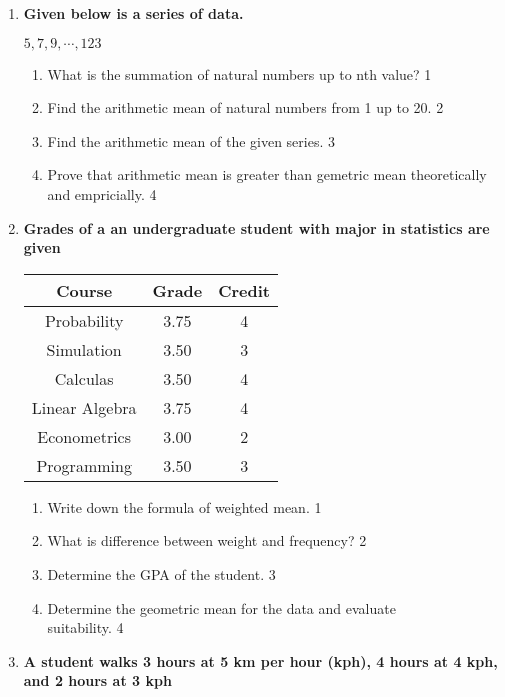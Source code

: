 \documentclass[a4paper,oneside]{book}
\begin{document}
\begin{enumerate}
   \item
	  \textbf{Given below is a series of data.} 
	  
	  	    \begin{center}
	 $5, 7, 9, \cdots , 123$
	    \end{center}
  
  \begin{enumerate}
    \item
	What is the summation of natural numbers up to nth value? \hfill 1
    \item
	Find the arithmetic mean of natural numbers from 1 up to 20. \hfill 2
    \item  
	Find the arithmetic mean of the given series. \hfill 3
    \item
	Prove that arithmetic mean is greater than gemetric mean theoretically and empricially. \hfill 4
  \end{enumerate}
  
   \item
	  \textbf{Grades of a an undergraduate student with major in statistics are given} 

\begin{table}[h]
\centering
\begin{tabular}{c|c|c}
\hline
Course & Grade & Credit \\ \hline
Probability & 3.75 & 4 \\ 
Simulation & 3.50 & 3 \\ 
Calculas & 3.50 & 4 \\ 
Linear Algebra & 3.75 & 4 \\ 
Econometrics & 3.00 & 2 \\ 
Programming & 3.50 & 3 \\ \hline
\end{tabular}
\end{table}

  
  \begin{enumerate}
    \item
	Write down the formula of weighted mean. \hfill 1
    \item
	What is difference between weight and frequency? \hfill 2
    \item  
	Determine the GPA of the student. \hfill 3
    \item
	Determine the geometric mean for the data and evaluate \\ suitability. \hfill 4
  \end{enumerate}

 \item
	  \textbf{A student walks 3 hours at 5 km per hour (kph), 4 hours at 4 kph, and 2 hours at 3 kph} 
  

\end{enumerate}
\end{document}
